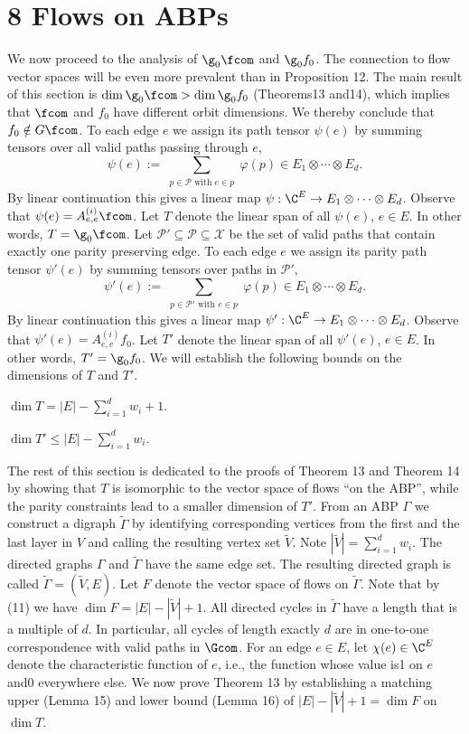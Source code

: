 \section*{8 Flows on ABPs}
We now proceed to the analysis of $\g_0\fcom$ and $\g_0f_0$. The connection to flow vector spaces will be even more prevalent than in Proposition 12. The main result of this section is $\dim\g_0\fcom>\dim\g_0f_0$ (Theorems13 and14), which implies that $\fcom$ and $f_0$ have different orbit dimensions. We thereby conclude that $f_0\notin G\fcom$.
To each edge $e$ we assign its path tensor $\psi(e)$ by summing tensors over all valid paths passing through $e$,
\[\psi(e):=\sum_{\substack{p\in\mathcal P\text{ with }e\in p}}\varphi(p)\in E_1\otimes\cdots\otimes E_d.\]
By linear continuation this gives a linear map $\psi:\C^E\to E_1\otimes\cdots\otimes E_d$. Observe that $\psi(e)=A^{(i)}_{e,e}\fcom$. Let $T$ denote the linear span of all $\psi(e)$, $e\in E$. In other words, $T=\g_0\fcom$.
Let $\mathcal P'\subseteq\mathcal P\subseteq\mathcal X$ be the set of valid paths that contain exactly one parity preserving edge. To each edge $e$ we assign its parity path tensor $\psi'(e)$ by summing tensors over paths in $\mathcal P'$,
\[\psi'(e):=\sum_{\substack{p\in\mathcal P'\text{ with }e\in p}}\varphi(p)\in E_1\otimes\cdots\otimes E_d.\]
By linear continuation this gives a linear map $\psi':\C^E\to E_1\otimes\cdots\otimes E_d$. Observe that $\psi'(e)=A^{(i)}_{e,e}f_0$. Let $T'$ denote the linear span of all $\psi'(e)$, $e\in E$. In other words, $T'=\g_0f_0$.
We will establish the following bounds on the dimensions of $T$ and $T'$.
\begin{theorem}$\dim T=|E|-\sum_{i=1}^d w_i+1$.\end{theorem}
\begin{theorem}$\dim T'\le|E|-\sum_{i=1}^d w_i$.\end{theorem}
The rest of this section is dedicated to the proofs of Theorem 13 and Theorem 14 by showing that $T$ is isomorphic to the vector space of flows ``on the ABP'', while the parity constraints lead to a smaller dimension of $T'$.
From an ABP $\Gamma$ we construct a digraph $\widetilde\Gamma$ by identifying corresponding vertices from the first and the last layer in $V$ and calling the resulting vertex set $\widetilde V$. Note $|\widetilde V|=\sum_{i=1}^d w_i$. The directed graphs $\Gamma$ and $\widetilde\Gamma$ have the same edge set. The resulting directed graph is called $\widetilde\Gamma=(\widetilde V,E)$. Let $F$ denote the vector space of flows on $\widetilde\Gamma$. Note that by (11) we have $\dim F=|E|-|\widetilde V|+1$. All directed cycles in $\widetilde\Gamma$ have a length that is a multiple of $d$. In particular, all cycles of length exactly $d$ are in one-to-one correspondence with valid paths in $\Gcom$. For an edge $e\in E$, let $\chi(e)\in\C^E$ denote the characteristic function of $e$, i.e., the function whose value is1 on $e$ and0 everywhere else.
We now prove Theorem 13 by establishing a matching upper (Lemma 15) and lower bound (Lemma 16) of $|E|-|\widetilde V|+1=\dim F$ on $\dim T$.
